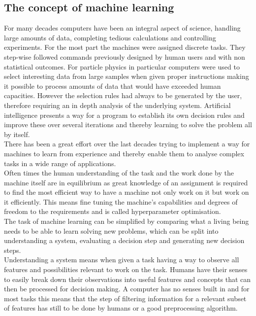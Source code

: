\subsection{The concept of machine learning}

For many decades computers have been an integral aspect of science, handling large amounts of data, completing tedious calculations and controlling experiments. For the most part the  machines were assigned discrete tasks. They step-wise followed commands previously designed by human users and with non statistical outcomes. 
For particle physics in particular computers were used to select interesting data from large samples when given proper instructions making it possible to process amounts of data that would have exceeded human capacities. However the selection rules had always to be generated by the user, therefore requiring an in depth analysis of the underlying system. Artificial intelligence presents a way for a program to establish its own decision rules and improve these over several iterations and thereby learning to solve the problem all by itself.\\
There has been a great effort over the last decades trying to implement a way for machines to learn from experience and thereby enable them to analyse complex tasks in a wide range of applications.\\
Often times the human understanding of the task and the work done by the machine itself are in equilibrium as great knowledge of an assignment is required to find the most efficient way to have a machine not only work on it but work on it efficiently. This means fine tuning the machine's capabilities and degrees of freedom to the requirements and is called hyperparameter optimisation.\\
The task of machine learning can be simplified by comparing what a living being needs to be able to learn solving new problems, which can be split into understanding a system, evaluating a decision step and generating new decision steps.\\
Understanding a system means when given a task having a way to observe all features and possibilities relevant to work on the task. Humans have their senses to easily break down their observations into useful features and concepts that can then be processed for decision making. A computer has no senses built in and for most tasks this means that the step of filtering information for a relevant subset of features has still to be done by humans or a good preprocessing algorithm.\\
